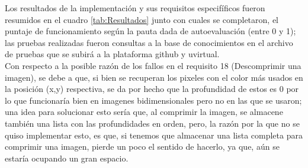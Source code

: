 Los resultados de la implementación y sus requisitos especifíficos fueron resumidos 
en el cuadro \ref{tab:Resultados} junto con cuales se completaron, el puntaje de 
funcionamiento según la pauta dada de autoevaluación (entre 0 y 1); las pruebas 
realizadas fueron consultas a la base de conocimientos en el archivo de pruebas que se subirá 
a la plataforma github y uvirtual.\\

Con respecto a la posible razón de los fallos en el requisito 18 (Descomprimir una imagen), 
se debe a que, si bien se recuperan los pixeles con el color más usados en la posición (x,y) respectiva,
se da por hecho que la profundidad de estos es 0 por lo que funcionaría bien en imagenes bidimensionales 
pero no en las que se usaron; una idea para solucionar esto sería que, al comprimir la imagen,
se almacene también una lista con las profundidades en orden, pero, la razón por la que no se quiso implementar 
esto, es que, si tenemos que almacenar una lista completa para comprimir una imagen, pierde un poco el sentido de hacerlo, 
ya que, aún se estaría ocupando un gran espacio.